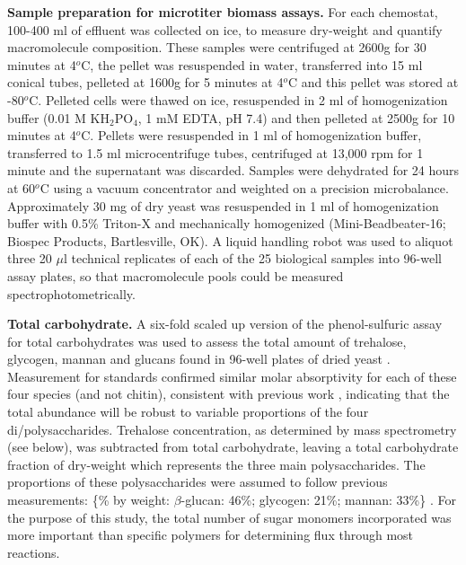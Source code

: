 \textbf{Sample preparation for microtiter biomass assays.} For each chemostat, 100-400 ml of effluent was collected on ice, to measure dry-weight and quantify macromolecule composition. These samples were centrifuged at 2600g for 30 minutes at 4$^{o}$C, the pellet was resuspended in water, transferred into 15 ml conical tubes, pelleted at 1600g for 5 minutes at 4$^{o}$C  and this pellet was stored at -80$^{o}$C.  Pelleted cells were thawed on ice, resuspended in 2 ml of homogenization buffer (0.01 M KH$_{2}$PO$_{4}$, 1 mM EDTA, pH 7.4) and then pelleted at 2500g for 10 minutes at 4$^{o}$C.  Pellets were resuspended in 1 ml of homogenization buffer, transferred to 1.5 ml microcentrifuge tubes, centrifuged at 13,000 rpm for 1 minute and the supernatant was discarded.  Samples were dehydrated for 24 hours at 60$^{o}$C using a vacuum concentrator and weighted on a precision microbalance. Approximately 30 mg of dry yeast was resuspended in 1 ml of homogenization buffer with 0.5\% Triton-X and mechanically homogenized (Mini-Beadbeater-16; Biospec Products, Bartlesville, OK).  A liquid handling robot was used to aliquot three 20 $\mu$l technical replicates of each of the 25 biological samples into 96-well assay plates, so that macromolecule pools could be measured spectrophotometrically.

\textbf{Total carbohydrate.} A six-fold scaled up version of the phenol-sulfuric assay for total carbohydrates was used to assess the total amount of trehalose, glycogen, mannan and glucans found in 96-well plates of dried yeast \cite{Masuko:2005fy}.  Measurement for standards confirmed similar molar absorptivity for each of these four species (and not chitin), consistent with previous work \cite{Masuko:2005fy}, indicating that the total abundance will be robust to variable proportions of the four di/polysaccharides.  Trehalose concentration, as determined by mass spectrometry (see below), was subtracted from total carbohydrate, leaving a total carbohydrate fraction of dry-weight which represents the three main polysaccharides.  The proportions of these polysaccharides were assumed to follow previous measurements: \{\% by weight: $\beta$-glucan: 46\%; glycogen: 21\%; mannan: 33\%\} \cite{Herrgard:2008gb}.  For the purpose of this study, the total number of sugar monomers incorporated was more important than specific polymers for determining flux through most reactions.  

